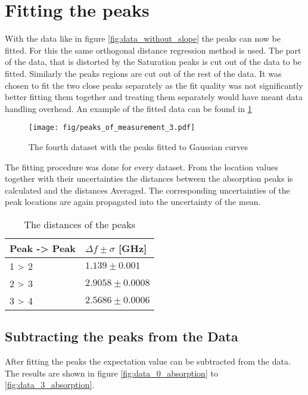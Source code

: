 \section{Fitting the peaks}
With the data like in figure \ref{fig:data_without_slope} the peaks can now be fitted. For this the same orthogonal distance regression method is
used. The part of the data, that is distorted by the Saturation peaks is cut out of the data to be fitted. Similarly the peaks regions are cut out of
the rest of the data. It was chosen to fit the two close peaks separately as the fit quality was not significantly better fitting them together and
treating them separately would have meant data handling overhead. An example of the fitted data can be found in \ref{fig:fitted_peaks}

\begin{figure}[tb]
	\texttt{[image: fig/peaks\_of\_measurement\_3.pdf]}
	\caption{The fourth dataset with the peaks fitted to Gaussian curves}
	\label{fig:fitted_peaks}
\end{figure}

The fitting procedure was done for every dataset. From the location values together with their uncertainties the distances between the absorption
peaks is calculated and the distances Averaged. The corresponding uncertainties of the peak locations are again propagated into the uncertainty of the mean.

\begin{table}
	\begin{center}
		\label{tab:freq_peaks}
		\begin{tabular}{|m{10em} m{10em}|}
			\hline
			\textbf{Peak -> Peak} & $\Delta f \pm \sigma$ [GHz]\\
			\hline\hline
			1 $\->$ 2& $ 1.139 \pm 0.001$ \\
			2 $\->$ 3& $ 2.9058 \pm 0.0008$ \\
			3 $\->$ 4& $ 2.5686 \pm 0.0006$ \\
			\hline
		\end{tabular}
		\caption{The distances of the peaks}
	\end{center}
\end{table}

\subsection{Subtracting the peaks from the Data}
After fitting the peaks the expectation value can be subtracted from the data. The results are shown in figure \ref{fig:data_0_absorption} to
\ref{fig:data_3_absorption}.

